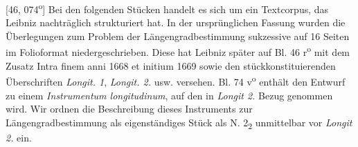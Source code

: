 [46, 074\textsuperscript{o}] Bei den folgenden St\"{u}cken handelt es sich um ein Textcorpus, das Leibniz nachtr\"{a}glich strukturiert hat. In der urspr\"{u}nglichen Fassung wurden die  \"{U}berlegungen zum Problem der L\"{a}ngengradbestimmung sukzessive auf 16 Seiten im Folioformat niedergeschrieben. Diese hat Leibniz sp\"{a}ter auf Bl. 46 r\textsuperscript{o} mit dem Zusatz Intra finem anni 1668 et initium 1669 sowie den st\"{u}ckkonstituierenden \"{U}berschriften \textit{Longit. 1}, \textit{Longit. 2.} usw. versehen. Bl. 74 v\textsuperscript{o} enth\"{a}lt den Entwurf zu einem \textit{Instrumentum longitudinum}, auf den in  \textit{Longit 2.} Bezug genommen wird. Wir ordnen die Beschreibung dieses Instruments zur L\"{a}ngengradbestimmung als eigenst\"{a}ndiges St\"{u}ck als N. 2\textsubscript{2} unmittelbar vor \textit{Longit 2.} ein.